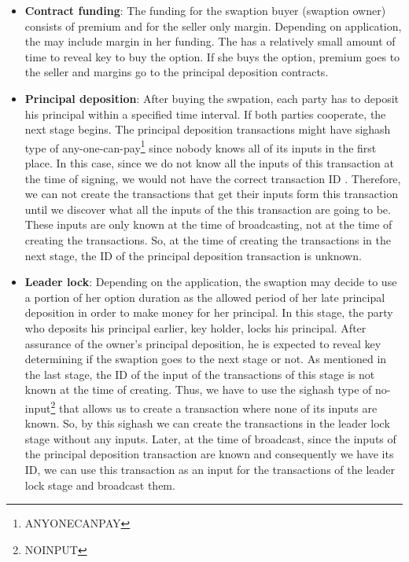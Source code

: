 \begin{itemize}

    \item \textbf{Contract funding}: The funding for the swaption buyer (swaption owner) consists of premium and for the seller only margin. Depending on application, the \SwaptionOwner may include margin in her funding.
    The \SwaptionOwner has a relatively small amount of time to reveal \Aone key to buy the option. If she buys the option, premium goes to the seller and margins go to the principal deposition contracts.
    
    \item \textbf{Principal deposition}: After buying the swpation, each party has to deposit his principal within a specified time interval. If both parties cooperate, the next stage begins.
    The principal deposition transactions might have sighash type of any-one-can-pay\footnote{ANYONECANPAY} since nobody knows all of its inputs in the first place. In this case, since we do not know all the inputs of this transaction at the time of signing, we would not have the correct transaction ID \cite{bip143}. Therefore, we can not create the transactions that get their inputs form this transaction until we discover what all the inputs of the this transaction are going to be. These inputs are only known at the time of broadcasting, not at the time of creating the transactions. So, at the time of creating the transactions in the next stage, the ID of the principal deposition transaction is unknown.
    
    \item \textbf{Leader lock}: Depending on the application, the swaption \SwaptionOwner may decide to use a portion of her option duration as the allowed period of her late principal deposition in order to make money for her principal. In this stage, the party who deposits his principal earlier, \keyone key holder, locks his principal. After assurance of the owner's principal deposition, he is expected to reveal \keyone key determining if the swaption goes to the next stage or not.
    As mentioned in the last stage, the ID of the input of the transactions of this stage is not known at the time of creating. Thus, we have to use the sighash type of no-input\footnote{NOINPUT}\cite{bip118} that allows us to create a transaction where none of its inputs are known. So, by this sighash we can create the transactions in the leader lock stage without any inputs. Later, at the time of broadcast, since the inputs of the principal deposition transaction are known and consequently we have its ID, we can use this transaction as an input for the transactions of the leader lock stage and broadcast them.
    

\end{itemize}
